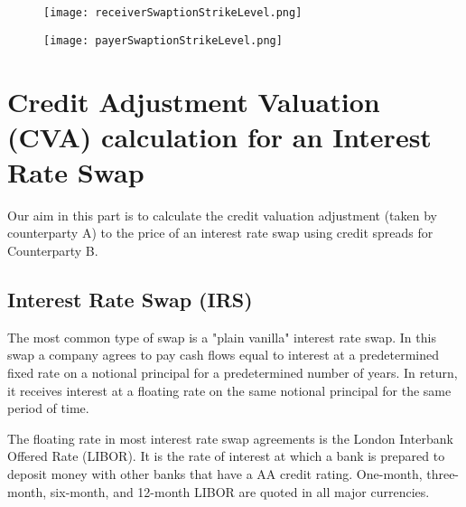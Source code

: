 \documentclass[11pt]{article}
\numberwithin{equation}{subsection}
\begin{document}
\begin{figure}[H]
	\texttt{[image: receiverSwaptionStrikeLevel.png]}
\end{figure}

\begin{figure}[H]
	\texttt{[image: payerSwaptionStrikeLevel.png]}
\end{figure}


\newpage
\section{Credit Adjustment Valuation (CVA) calculation for an Interest Rate Swap}
Our aim in this part is to calculate the credit valuation adjustment (taken by counterparty A) to the price of an interest rate swap using credit spreads for Counterparty B.\\

\subsection{Interest Rate Swap (IRS)}
The most common type of swap is a "plain vanilla" interest rate swap. In this swap a
company agrees to pay cash flows equal to interest at a predetermined fixed rate on a
notional principal for a predetermined number of years. In return, it receives interest at
a floating rate on the same notional principal for the same period of time.

The floating rate in most interest rate swap agreements is the London Interbank Offered
Rate (LIBOR). It is the rate of interest at which a bank is prepared to deposit money with other banks that have a AA credit rating. One-month, three-month, six-month, and 12-month LIBOR are quoted in all major currencies.
\end{document}
